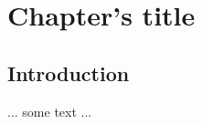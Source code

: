 \chapter{Chapter's title}
\label{sec:chapter1}


\section{Introduction}
\label{sec:chapter1:introduction}

... some text ...


